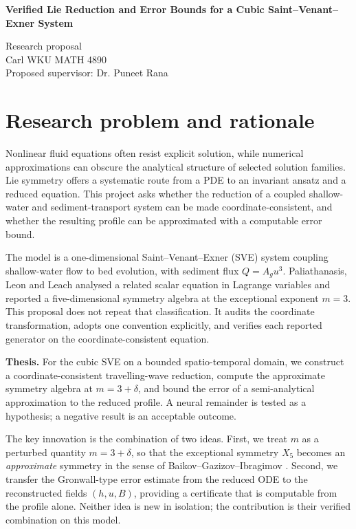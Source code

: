 \documentclass[12pt,a4paper]{article}
\begin{document}
\begin{center}
\textbf{Verified Lie Reduction and Error Bounds for a Cubic Saint--Venant--Exner System}

Research proposal\\
Carl \quad WKU MATH 4890\\
Proposed supervisor: Dr. Puneet Rana
\end{center}

\section{Research problem and rationale}
Nonlinear fluid equations often resist explicit solution, while numerical approximations can obscure the analytical structure of selected solution families. Lie symmetry offers a systematic route from a PDE to an invariant ansatz and a reduced equation. This project asks whether the reduction of a coupled shallow-water and sediment-transport system can be made coordinate-consistent, and whether the resulting profile can be approximated with a computable error bound.

The model is a one-dimensional Saint--Venant--Exner (SVE) system coupling shallow-water flow to bed evolution, with sediment flux $Q=A_g u^3$. Paliathanasis, Leon and Leach \cite{sve} analysed a related scalar equation in Lagrange variables and reported a five-dimensional symmetry algebra at the exceptional exponent $m=3$. This proposal does not repeat that classification. It audits the coordinate transformation, adopts one convention explicitly, and verifies each reported generator on the coordinate-consistent equation.

\textbf{Thesis.} For the cubic SVE on a bounded spatio-temporal domain, we construct a coordinate-consistent travelling-wave reduction, compute the approximate symmetry algebra at $m=3+\delta$, and bound the error of a semi-analytical approximation to the reduced profile. A neural remainder is tested as a hypothesis; a negative result is an acceptable outcome.

The key innovation is the combination of two ideas. First, we treat $m$ as a perturbed quantity $m=3+\delta$, so that the exceptional symmetry $X_5$ becomes an \emph{approximate} symmetry in the sense of Baikov--Gazizov--Ibragimov \cite{bgi}. Second, we transfer the Gronwall-type error estimate from the reduced ODE to the reconstructed fields $(h,u,B)$, providing a certificate that is computable from the profile alone. Neither idea is new in isolation; the contribution is their verified combination on this model.
\end{document}
